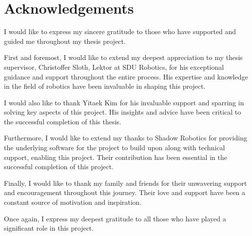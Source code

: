 \section*{Acknowledgements}

I would like to express my sincere gratitude to those who have supported and guided me throughout my thesis project. \medskip

First and foremost, I would like to extend my deepest appreciation to my thesis supervisor, Christoffer Sloth, Lektor at SDU Robotics, for his exceptional guidance and support throughout the entire process. His expertise and knowledge in the field of robotics have been invaluable in shaping this project. \medskip

I would also like to thank Yitaek Kim for his invaluable support and sparring in solving key aspects of this project. His insights and advice have been critical to the successful completion of this thesis. \medskip

Furthermore, I would like to extend my thanks to Shadow Robotics for providing the underlying software for the project to build upon along with technical support, enabling this project. Their contribution has been essential in the successful completion of this project. \medskip

Finally, I would like to thank my family and friends for their unwavering support and encouragement throughout this journey. Their love and support have been a constant source of motivation and inspiration. \medskip

Once again, I express my deepest gratitude to all those who have played a significant role in this project.